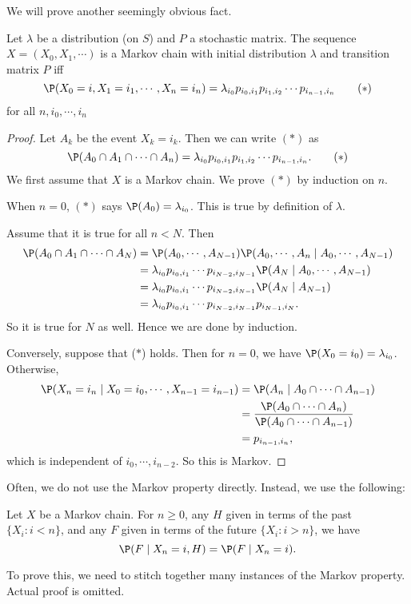 \documentclass[a4paper]{article}
\begin{document}
We will prove another seemingly obvious fact.
\begin{thm}
  Let $\lambda$ be a distribution (on $S$) and $P$ a stochastic matrix. The sequence $X = (X_0, X_1, \cdots)$ is a Markov chain with initial distribution $\lambda$ and transition matrix $P$ iff
  \[
    \P(X_0 = i, X_1 = i_1, \cdots, X_n = i_n) = \lambda_{i_0}p_{i_0, i_1}p_{i_1, i_2}\cdots p_{i_{n - 1}, i_n}\tag{$*$}
  \]
  for all $n, i_0, \cdots, i_n$
\end{thm}
\begin{proof}
  Let $A_k$ be the event $X_k = i_k$. Then we can write $(*)$ as
  \[
    \P(A_0\cap A_1\cap\cdots \cap A_n) = \lambda_{i_0}p_{i_0, i_1}p_{i_1, i_2}\cdots p_{i_{n - 1}, i_n}. \tag{$*$}
  \]
  We first assume that $X$ is a Markov chain. We prove $(*)$ by induction on $n$.

  When $n = 0$, $(*)$ says $\P(A_0) = \lambda_{i_0}$. This is true by definition of $\lambda$.

  Assume that it is true for all $n < N$. Then
  \begin{align*}
    \P(A_0 \cap A_1 \cap \cdots \cap A_N) &= \P(A_0,\cdots, A_{N - 1})\P(A_0, \cdots, A_n \mid A_0, \cdots, A_{N - 1})\\
    &= \lambda_{i_0} p_{i_0, i_1}\cdots p_{i_{N - 2}, i_{N - 1}} \P(A_{N} \mid A_0,\cdots, A_{N - 1})\\
    &= \lambda_{i_0} p_{i_0, i_1}\cdots p_{i_{N - 2}, i_{N - 1}} \P(A_{N} \mid A_{N - 1})\\
    &= \lambda_{i_0} p_{i_0, i_1}\cdots p_{i_{N - 2}, i_{N - 1}} p_{i_{N - 1}, i_N}.
  \end{align*}
  So it is true for $N$ as well. Hence we are done by induction.

  Conversely, suppose that ($*$) holds. Then for $n = 0$, we have $\P(X_0 = i_0) = \lambda_{i_0}$. Otherwise,
  \begin{align*}
    \P(X_n = i_n\mid X_0 = i_0, \cdots, X_{n - 1} = i_{n - 1}) &= \P(A_n \mid A_0 \cap \cdots\cap A_{n - 1})\\
    &= \frac{\P(A_0\cap \cdots \cap A_n)}{\P(A_0\cap \cdots \cap A_{n - 1})}\\
    &= p_{i_{n - 1}, i_n},
  \end{align*}
  which is independent of $i_0, \cdots, i_{n - 2}$. So this is Markov.
\end{proof}

Often, we do not use the Markov property directly. Instead, we use the following:
\begin{thm}
  Let $X$ be a Markov chain. For $n \geq 0$, any $H$ given in terms of the past $\{X_i: i < n\}$, and any $F$ given in terms of the future $\{X_i: i > n\}$, we have
  \[
    \P(F\mid X_n = i, H) = \P(F\mid X_n = i).
  \]
\end{thm}
To prove this, we need to stitch together many instances of the Markov property. Actual proof is omitted.
\end{document}
